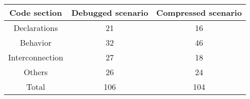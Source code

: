 
\begin{tabular}{|c|cc|}
\hline
Code section    &  Debugged scenario & Compressed scenario\\
\hline 
Declarations    &  21      & 16  \\
Behavior        &  32      & 46  \\
Interconnection &  27      & 18   \\
Others          &  26      & 24  \\
\hline
Total           &  106     & 104 \\
\hline
\end{tabular}
